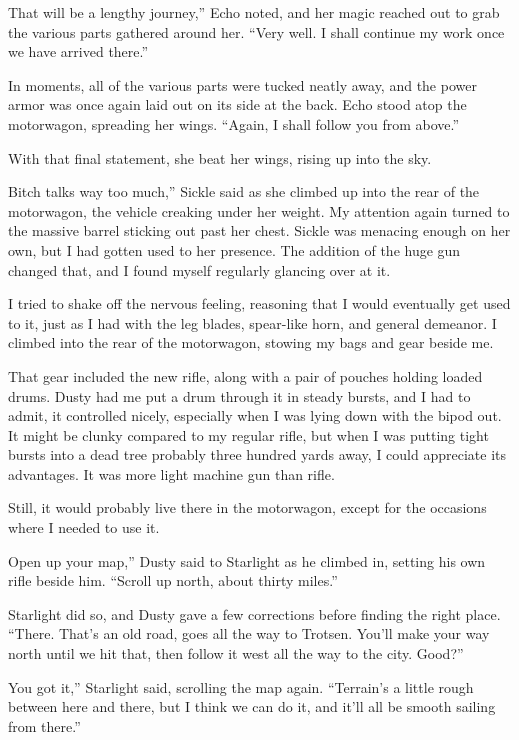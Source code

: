 \leavevmode{}That will be a lengthy journey,” Echo noted, and her magic reached out to grab the various parts gathered around her. “Very well. I shall continue my work once we have arrived there.”

In moments, all of the various parts were tucked neatly away, and the power armor was once again laid out on its side at the back. Echo stood atop the motorwagon, spreading her wings. “Again, I shall follow you from above.”

With that final statement, she beat her wings, rising up into the sky.

\leavevmode{}Bitch talks way too much,” Sickle said as she climbed up into the rear of the motorwagon, the vehicle creaking under her weight. My attention again turned to the massive barrel sticking out past her chest. Sickle was menacing enough on her own, but I had gotten used to her presence. The addition of the huge gun changed that, and I found myself regularly glancing over at it.

I tried to shake off the nervous feeling, reasoning that I would eventually get used to it, just as I had with the leg blades, spear-like horn, and general demeanor. I climbed into the rear of the motorwagon, stowing my bags and gear beside me.

That gear included the new rifle, along with a pair of pouches holding loaded drums. Dusty had me put a drum through it in steady bursts, and I had to admit, it controlled nicely, especially when I was lying down with the bipod out. It might be clunky compared to my regular rifle, but when I was putting tight bursts into a dead tree probably three hundred yards away, I could appreciate its advantages. It was more light machine gun than rifle.

Still, it would probably live there in the motorwagon, except for the occasions where I needed to use it.

\leavevmode{}Open up your map,” Dusty said to Starlight as he climbed in, setting his own rifle beside him. “Scroll up north, about thirty miles.”

Starlight did so, and Dusty gave a few corrections before finding the right place. “There. That’s an old road, goes all the way to Trotsen. You’ll make your way north until we hit that, then follow it west all the way to the city. Good?”

\leavevmode{}You got it,” Starlight said, scrolling the map again. “Terrain’s a little rough between here and there, but I think we can do it, and it’ll all be smooth sailing from there.”

